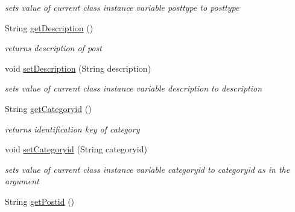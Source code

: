 \begin{DoxyCompactItemize}
\begin{DoxyCompactList}\small\item\em sets value of current class instance variable posttype to posttype \end{DoxyCompactList}\item 
String \hyperlink{classcom_1_1example_1_1sel_1_1lostfound_1_1UserPost_a1310c639b4bf549b804d5ac5f46ca571}{get\+Description} ()\hypertarget{classcom_1_1example_1_1sel_1_1lostfound_1_1UserPost_a1310c639b4bf549b804d5ac5f46ca571}{}\label{classcom_1_1example_1_1sel_1_1lostfound_1_1UserPost_a1310c639b4bf549b804d5ac5f46ca571}

\begin{DoxyCompactList}\small\item\em returns description of post \end{DoxyCompactList}\item 
void \hyperlink{classcom_1_1example_1_1sel_1_1lostfound_1_1UserPost_a1f7260a82ead3b576888de9ae9e9a8a0}{set\+Description} (String description)\hypertarget{classcom_1_1example_1_1sel_1_1lostfound_1_1UserPost_a1f7260a82ead3b576888de9ae9e9a8a0}{}\label{classcom_1_1example_1_1sel_1_1lostfound_1_1UserPost_a1f7260a82ead3b576888de9ae9e9a8a0}

\begin{DoxyCompactList}\small\item\em sets value of current class instance variable description to description \end{DoxyCompactList}\item 
String \hyperlink{classcom_1_1example_1_1sel_1_1lostfound_1_1UserPost_ae3df884a795d2fea3730020c162acf8c}{get\+Categoryid} ()\hypertarget{classcom_1_1example_1_1sel_1_1lostfound_1_1UserPost_ae3df884a795d2fea3730020c162acf8c}{}\label{classcom_1_1example_1_1sel_1_1lostfound_1_1UserPost_ae3df884a795d2fea3730020c162acf8c}

\begin{DoxyCompactList}\small\item\em returns identification key of category \end{DoxyCompactList}\item 
void \hyperlink{classcom_1_1example_1_1sel_1_1lostfound_1_1UserPost_a27de2d7f2b62da17bf46f3cd3e173139}{set\+Categoryid} (String categoryid)\hypertarget{classcom_1_1example_1_1sel_1_1lostfound_1_1UserPost_a27de2d7f2b62da17bf46f3cd3e173139}{}\label{classcom_1_1example_1_1sel_1_1lostfound_1_1UserPost_a27de2d7f2b62da17bf46f3cd3e173139}

\begin{DoxyCompactList}\small\item\em sets value of current class instance variable categoryid to categoryid as in the argument \end{DoxyCompactList}\item 
String \hyperlink{classcom_1_1example_1_1sel_1_1lostfound_1_1UserPost_a80475c33f4fb24120e5749b8d4eaa8cd}{get\+Postid} ()\hypertarget{classcom_1_1example_1_1sel_1_1lostfound_1_1UserPost_a80475c33f4fb24120e5749b8d4eaa8cd}{}\label{classcom_1_1example_1_1sel_1_1lostfound_1_1UserPost_a80475c33f4fb24120e5749b8d4eaa8cd}


\end{DoxyCompactItemize}
